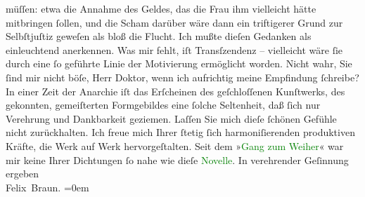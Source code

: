                     müſſen: etwa die Annahme des Geldes, das die Frau ihm vielleicht hätte
                    mitbringen ſollen, und die Scham darüber wäre dann ein triftigerer Grund zur
                    Selbſtjuſtiz geweſen als bloß die Flucht. Ich {\pb}mußte dieſen
                    Gedanken als einleuchtend anerkennen. Was mir fehlt, iſt Transſzendenz –
                    vielleicht wäre ſie durch eine ſo geführte Linie der Motivierung ermöglicht
                    worden. Nicht wahr, Sie ſind mir nicht böſe, Herr Doktor, wenn ich aufrichtig
                    meine Empfindung ſchreibe?\pend
           \pstart
           In einer Zeit der Anarchie iſt das Erſcheinen des geſchloſſenen Kunſtwerks, des
                    gekonnten, gemeiſterten Formgebildes eine ſolche Seltenheit, daß ſich nur
                    Verehrung und Dankbarkeit geziemen. Laſſen Sie mich dieſe ſchönen Gefühle nicht
                    zurückhalten. Ich freue mich Ihrer ſtetig ſich harmoni{\pb}ſierenden
                    produktiven Kräfte, die Werk auf Werk hervorgeſtalten. Seit dem »\textcolor{green}{Gang zum Weiher}{}\ledrightnote{\textcolor{green}{Der Gang zum Weiher. Dramatische Dichtung}}« war mir keine Ihrer
                    Dichtungen ſo nahe wie dieſe \textcolor{green}{Novelle}{}.\pend
           \pstart
           In verehrender Geſinnung ergeben{\\[\baselineskip]}\spacefill\mbox{Felix Braun.}\pend
           \leftskip=0em{}\endnumbering{}  
      